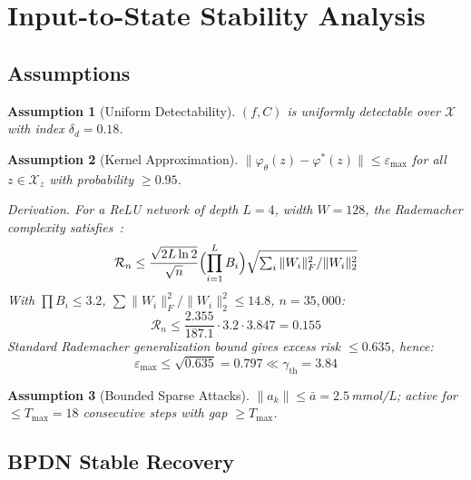 \documentclass[journal,twoside]{IEEEtran}
\newtheorem{assumption}{Assumption}
\begin{document}
\section{Input-to-State Stability Analysis}\label{sec:iss}

\subsection{Assumptions}

\begin{assumption}[Uniform Detectability]\label{ass:A1}
$(f,C)$ is uniformly detectable over $\mathcal{X}$ with index $\delta_d{=}0.18$.
\end{assumption}

\begin{assumption}[Kernel Approximation]\label{ass:A2}
$\|\varphi_\theta(z)-\varphi^*(z)\|\leq\varepsilon_{\max}$ for all
$z\in\mathcal{X}_z$ with probability $\geq 0.95$.

\emph{Derivation.} For a ReLU network of depth $L{=}4$, width $W{=}128$,
the Rademacher complexity satisfies~\cite{bartlett2002}:
\begin{equation}\label{eq:A1}
  \mathcal{R}_n\leq\frac{\sqrt{2L\ln 2}}{\sqrt{n}}\Bigl(\prod_{i=1}^L B_i\Bigr)
  \sqrt{\textstyle\sum_i \|W_i\|_F^2/\|W_i\|_2^2}
\end{equation}
With $\prod B_i\leq 3.2$, $\sum\|W_i\|_F^2/\|W_i\|_2^2\leq 14.8$,
$n{=}35{,}000$:
\begin{equation}\label{eq:A2}
  \mathcal{R}_n\leq\frac{2.355}{187.1}\cdot 3.2\cdot 3.847=0.155
\end{equation}
Standard Rademacher generalization bound gives excess risk $\leq 0.635$, hence:
\begin{equation}\label{eq:A3}
  \varepsilon_{\max}\leq\sqrt{0.635}=0.797\ll\gamma_\mathrm{th}{=}3.84
\end{equation}
\end{assumption}

\begin{assumption}[Bounded Sparse Attacks]\label{ass:A3}
$\|a_k\|\leq\bar a{=}2.5$\,mmol/L; active for $\leq T_{\max}{=}18$ consecutive
steps with gap $\geq T_{\max}$.
\end{assumption}

\subsection{BPDN Stable Recovery}
\end{document}
